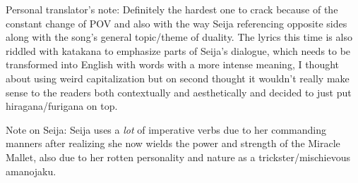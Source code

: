 \documentclass{article}
\begin{document}
Personal translator's note: Definitely the hardest one to crack because of the constant change of POV and also with the way Seija referencing opposite sides along with the song's general topic/theme of duality. The lyrics this time is also riddled with katakana to emphasize parts of Seija's dialogue, which needs to be transformed into English with words with a more intense meaning, I thought about using weird capitalization but on second thought it wouldn't really make sense to the readers both contextually and aesthetically and decided to just put hiragana/furigana on top.

Note on Seija: Seija uses a \emph{lot} of imperative verbs due to her commanding manners after realizing she now wields the power and strength of the Miracle Mallet, also due to her rotten personality and nature as a trickster/mischievous amanojaku.
\end{document}
